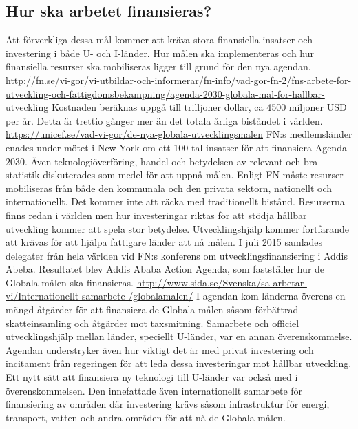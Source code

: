 \documentclass{report}
\begin{document}
\subsection{Hur ska arbetet finansieras?} 
Att förverkliga dessa mål kommer att kräva stora finansiella insatser och  investering i både U- och I-länder. \cite{web2030agenda}
Hur målen ska implementeras och hur finansiella resurser ska mobiliseras ligger till grund för den nya agendan. \url {http://fn.se/vi-gor/vi-utbildar-och-informerar/fn-info/vad-gor-fn-2/fns-arbete-for-utveckling-och-fattigdomsbekampning/agenda-2030-globala-mal-for-hallbar-utveckling} 
Kostnaden beräknas uppgå till trilljoner dollar, \cite{web2030agenda} ca 4500 miljoner USD per år. Detta är trettio gånger mer än det totala årliga biståndet i världen. \url {https://unicef.se/vad-vi-gor/de-nya-globala-utvecklingsmalen} FN:s medlemsländer enades under mötet i New York om ett 100-tal insatser för att finansiera Agenda 2030. Även teknologiöverföring, handel och betydelsen av relevant och bra statistik diskuterades som medel för att uppnå målen. \cite{webUNASweden}
Enligt FN måste resurser mobiliseras från både den kommunala och den privata sektorn, nationellt och internationellt. Det kommer inte att räcka med traditionellt bistånd. Resurserna finns redan i världen men hur investeringar riktas för att stödja hållbar utveckling kommer att spela stor betydelse. Utvecklingshjälp kommer fortfarande att krävas för att hjälpa fattigare länder att nå målen. 
\cite{web2030agenda}
I juli 2015 samlades delegater från hela världen vid FN:s konferens om utvecklingsfinansiering i Addis Abeba. Resultatet blev Addis Ababa Action Agenda, som fastställer hur de Globala målen ska finansieras. \url { http://www.sida.se/Svenska/sa-arbetar-vi/Internationellt-samarbete-/globalamalen/}
I agendan kom länderna överens en mängd åtgärder för att finansiera de Globala målen såsom förbättrad skatteinsamling och åtgärder mot taxsmitning. Samarbete och officiel utvecklingshjälp mellan länder, speciellt U-länder, var en annan överenskommelse. Agendan understryker även hur viktigt det är med privat investering och incitament från regeringen för att leda dessa investeringar mot hållbar utveckling. Ett nytt sätt att finansiera ny teknologi till U-länder var också med i överenskommelsen. Den innefattade även internationellt samarbete för finansiering av områden där investering krävs såsom infrastruktur för energi, transport, vatten och andra områden för att nå de Globala målen.  
\cite{webUNDESA}\\
\end{document}
